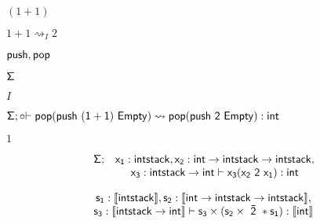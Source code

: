 \documentclass[10pt]{book}
\begin{document}
\begin{mdSnippets}
\begin{mdInlineSnippet}[084d81b8c5dc70186c48137b0f155453]%
$(1+1)$\end{mdInlineSnippet}%
\begin{mdInlineSnippet}[4fd47922d2b9f5b8fc0bc97eeb6394fb]%
$1+1\rightsquigarrow_{I} 2$\end{mdInlineSnippet}%
\begin{mdInlineSnippet}%
${\sf push, pop}$\end{mdInlineSnippet}%
\begin{mdInlineSnippet}%
${\sf \Sigma}$\end{mdInlineSnippet}%
\begin{mdInlineSnippet}[dd7536794b63bf90eccfd37f9b147d7f]%
$I$\end{mdInlineSnippet}%
\begin{mdInlineSnippet}[7b6f56cb9f8ad56e908b92d5cc3a7c1f]%
${\sf \Sigma}; {\sf \circ {\vdash pop (push \ (1+1) \ Empty)\rightsquigarrow pop (push \ 2 \ Empty) :int}}$\end{mdInlineSnippet}%
\begin{mdInlineSnippet}[c4ca4238a0b923820dcc509a6f75849b]%
$1$\end{mdInlineSnippet}%
\begin{mdDisplaySnippet}[755ee2f1c61ac8644c13fb9e310eebf4]%
\[%
\begin{array}{c c}
{\sf \Sigma;}&  {\sf x_1:intstack,  x_2:int\rightarrow intstack\rightarrow intstack,}\\
&  {\sf x_3:intstack\rightarrow int \vdash   x_3 (x_2 \ 2\  x_1):int} 
\end{array}
\]%
\end{mdDisplaySnippet}%
\begin{mdDisplaySnippet}%
\[%
\begin{array}{c}
{\sf s_1:\llbracket intstack\rrbracket,  s_2:\llbracket int\rightarrow intstack\rightarrow intstack\rrbracket},\\
{\sf s_3:\llbracket intstack\rightarrow int \rrbracket \vdash   s_3 \times (s_2 \times \ \bar{2}\ * s_1):\llbracket int\rrbracket} 
\end{array}
\]%
\end{mdDisplaySnippet}%

\end{mdSnippets}
\end{document}
